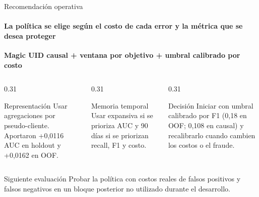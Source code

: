\documentclass[aspectratio=169,11pt]{beamer}
\begin{document}
\begin{frame}{Recomendación operativa}
  \framesubtitle{La política se elige según el costo de cada error y la métrica que se desea proteger}
  \vspace{0.25em}
  \begin{center}
    \colorbox{mist}{\parbox{0.90\textwidth}{\centering
      \color{ink}\Large\bfseries Magic UID causal + ventana por objetivo + umbral calibrado por costo}}
  \end{center}
  \vspace{0.55em}
  \begin{columns}[T]
    \begin{column}{0.31\textwidth}
      \begin{block}{Representación}
        \small Usar agregaciones por pseudo-cliente. Aportaron +0,0116 AUC en holdout y +0,0162 en OOF.
      \end{block}
    \end{column}
    \begin{column}{0.31\textwidth}
      \begin{block}{Memoria temporal}
        \small Usar expansiva si se prioriza AUC y 90 días si se priorizan recall, F1 y costo.
      \end{block}
    \end{column}
    \begin{column}{0.31\textwidth}
      \begin{block}{Decisión}
        \small Iniciar con umbral calibrado por F1 (0,18 en OOF; 0,108 en causal) y recalibrarlo cuando cambien los costos o el fraude.
      \end{block}
    \end{column}
  \end{columns}
  \vspace{0.55em}
  \begin{alertblock}{Siguiente evaluación}
    \centering Probar la política con costos reales de falsos positivos y falsos negativos en un bloque posterior no utilizado durante el desarrollo.
  \end{alertblock}
\end{frame}
\end{document}
